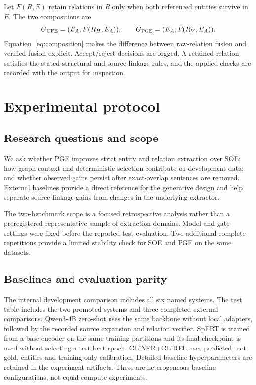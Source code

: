 \documentclass[preprint,12pt]{elsarticle}
\begin{document}
Let $F(R,E)$ retain relations in $R$ only when both referenced entities survive
in $E$. The two compositions are
\begin{equation}
G_{\rm CFE}=(E_A,F(R_H,E_A)),\qquad
G_{\rm PGE}=(E_A,F(R_V,E_A)).
\label{eq:composition}
\end{equation}
Equation~\eqref{eq:composition} makes the difference between raw-relation
fusion and verified fusion explicit. Accept/reject decisions are logged. A
retained relation satisfies the stated structural and source-linkage rules, and
the applied checks are recorded with the output for inspection.

\section{Experimental protocol}
\label{sec:experiment}
\subsection{Research questions and scope}
We ask whether PGE improves strict entity and relation extraction over SOE;
how graph context and deterministic selection contribute on development data;
and whether observed gains persist after exact-overlap sentences are removed.
External baselines provide a direct reference for the generative design and
help separate source-linkage gains from changes in the underlying extractor.

The two-benchmark scope is a focused retrospective analysis rather than a
preregistered representative sample of extraction domains. Model and gate
settings were fixed before the reported test evaluation. Two additional
complete repetitions provide a limited stability check for SOE and PGE on the
same datasets.

\subsection{Baselines and evaluation parity}
The internal development comparison includes all six named systems. The test
table includes the two promoted systems and three completed external
comparisons. Qwen3-4B zero-shot uses the same backbone without local adapters,
followed by the recorded source expansion and relation verifier. SpERT is
trained from a base encoder on the same training partitions and its final
checkpoint is used without selecting a test-best epoch. GLiNER+GLiREL uses
predicted, not gold, entities and training-only calibration. Detailed baseline
hyperparameters are retained in the experiment artifacts. These are
heterogeneous baseline configurations, not equal-compute experiments.
\end{document}

